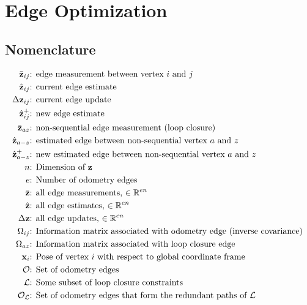 
\section{Edge Optimization}

\subsection{Nomenclature}

\begin{align*}
\emeas_{ij}   & \text{: edge measurement between vertex $i$ and $j$}\\
\eest_{ij}    & \text{: current edge estimate} \\
\Delta\e_{ij} & \text{: current edge update}\\
\eest_{ij}^+  & \text{: new edge estimate}\\
\emeas_{az}   & \text{: non-sequential edge measurement (loop closure)}\\
\eest_{a-z}   & \text{: estimated edge between non-sequential vertex $a$ and $z$} \\
\eest_{a-z}^+ & \text{: new estimated edge between non-sequential vertex $a$ and $z$} \\
%
%
n & \text{: Dimension of $\e$ } \\
e & \text{: Number of odometry edges } \\
%
%
\emeas   & \text{: all edge measurements, $\in \mathbb{R}^{en}$}\\
\eest    & \text{: all edge estimates, $\in \mathbb{R}^{en}$}\\
\Delta\e & \text{: all edge updates,  $\in \mathbb{R}^{en}$}\\
%
%
\Omega_{ij} & \text{: Information matrix associated with odometry edge (inverse covariance) } \\
\Omega_{az} & \text{: Information matrix associated with loop closure edge } \\
%
%
\mathbf{x}_i & \text{: Pose of vertex $i$ with respect to global coordinate frame} \\
\mathcal{O} & \text{: Set of odometry edges} \\
\mathcal{L} & \text{: Some subset of loop closure constraints} \\
\mathcal{O_L} & \text{: Set of odometry edges that form the redundant paths of $\mathcal{L}$} \\
\end{align*}

